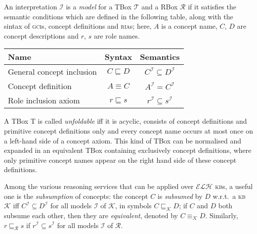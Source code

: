 \documentclass[]{llncs}
\newcommand{\elh}{\(\mathcal{ELH}{}\)}
\newcommand{\kb}{\textsc{kb}}
\newcommand{\ria}{\textsc{ria}}
\newcommand{\gci}{\textsc{gci}}
\newcommand{\subsume}[1]{\sqsubseteq_{\mathcal{#1}}}
\begin{document}
  An interpretation \(\mathcal{I}\) is a \emph{model} for a TBox \(\mathcal{T}\) and a RBox \(\mathcal{R}\) if it satisfies the semantic conditions which are defined in the following table, along with the sintax of \gci{}s, concept definitions and \ria{}s; here, \(A\) is a concept name, \(C\), \(D\) are concept descriptions and \(r\), \(s\) are role names.
  \begin{center}
    \begin{tabular}{lcc}
      \toprule
      Name & Syntax & Semantics \\
      \midrule
      General concept inclusion & \(C \sqsubseteq D\) & \(C^\mathcal{I} \subseteq D^\mathcal{I}\) \\
      Concept definition & \(A \equiv C\) & \(A^\mathcal{I} = C^\mathcal{I}\) \\
      Role inclusion axiom & \(r \sqsubseteq s\) & \(r^\mathcal{I} \subseteq s^\mathcal{I}\) \\
      \bottomrule
    \end{tabular}
  \end{center}
  A TBox T is called \emph{unfoldable} iff it is acyclic, consists of concept definitions and primitive concept definitions only and every concept name occurs at most once on a left-hand side of a concept axiom.
  This kind of TBox can be normalised and expanded in an equivalent TBox containing exclusively concept definitions, where only primitive concept names appear on the right hand side of these concept definitions.

  Among the various reasoning services that can be applied over \elh{} \kb{}s, a useful one is the \emph{subsumption} of concepts: the concept \(C\) is \emph{subsumed} by \(D\) w.r.t.\ a \kb{} \(\mathcal{K}\) iff \(C^\mathcal{I} \subseteq D^\mathcal{I}\) for all models \(\mathcal{I}\) of \(\mathcal{K}\), in symbols \(C \subsume{K} D\);
  if \(C\) and \(D\) both subsume each other, then they are \emph{equivalent}, denoted by \(C \equiv_{\mathcal{K}} D\).
  Similarly, \(r \subsume{R} s\) if \(r^\mathcal{I} \subseteq s^\mathcal{I}\) for all models \(\mathcal{I}\) of \(\mathcal{R}\).
\end{document}
